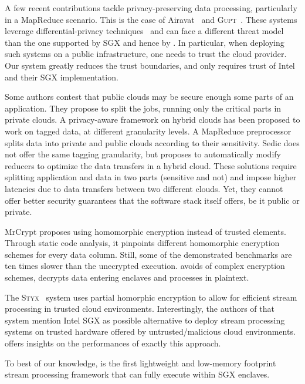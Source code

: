 A few recent contributions tackle privacy-preserving data processing, particularly in a MapReduce scenario.
This is the case of Airavat~\cite{Roy:2010:ASP:1855711.1855731} and \textsc{Gupt}~\cite{Mohan:2012:GPP:2213836.2213876}.
These systems leverage differential-privacy techniques~\cite{dwork2006calibrating} and can face a different threat model than the one supported by SGX and hence by \SYS.
In particular, when deploying such systems on a public infrastructure, one needs to trust the cloud provider.
Our system greatly reduces the trust boundaries, and only requires trust of Intel{\textregistered} and their SGX implementation.

Some authors contest that public clouds may be secure enough some parts of an application.
They propose to split the jobs, running only the critical parts in private clouds.
A privacy-aware framework on hybrid clouds \cite{xu2015framework} has been proposed to work on tagged data, at different granularity levels.
A MapReduce preprocessor splits data into private and public clouds according to their sensitivity.
Sedic \cite{zhang2011sedic} does not offer the same tagging granularity, but proposes to automatically modify reducers to optimize the data transfers in a hybrid cloud.
These solutions require splitting application and data in two parts (sensitive and not) and impose higher latencies due to data transfers between two different clouds.
Yet, they cannot offer better security guarantees that the software stack itself offers, be it public or private.

MrCrypt \cite{tetali2013mrcrypt} proposes using homomorphic encryption instead of trusted elements.
Through static code analysis, it pinpoints different homomorphic encryption schemes for every data column.
Still, some of the demonstrated benchmarks are ten times slower than the unecrypted execution.
\SYS{} avoids of complex encryption schemes, decrypts data entering enclaves and processes in plaintext.

The \textsc{Styx}~\cite{Stephen:2016:SSP:2987550.2987574} system uses partial homorphic encryption to allow for efficient stream processing in trusted cloud environments.
Interestingly, the authors of that system mention Intel{\textregistered} SGX as possible alternative to deploy stream processing systems on trusted hardware offered by untrusted/malicious cloud environments.
\SYS{} offers insights on the performances of exactly this approach.

To best of our knowledge, \SYS{} is the first lightweight and low-memory footprint stream processing framework that can fully execute within SGX enclaves.
